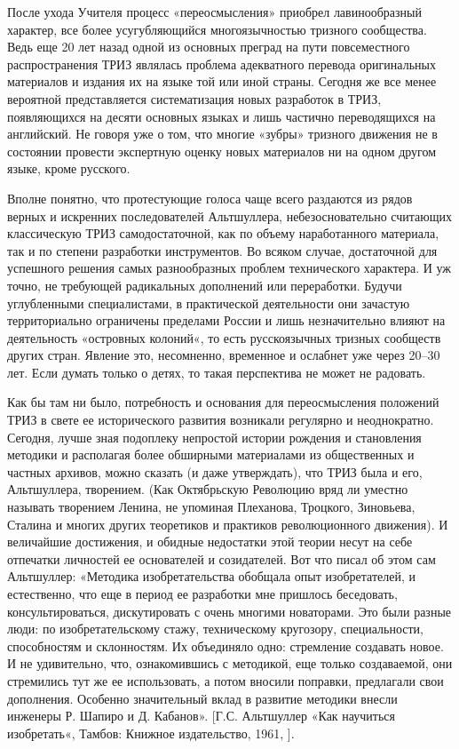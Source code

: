 \documentclass[11pt,a4paper]{article}
\begin{document}
После ухода Учителя процесс «переосмысления» приобрел лавинообразный характер,
все более усугубляющийся многоязычностью тризного сообщества. Ведь еще 20 лет
назад одной из основных преград на пути повсеместного распространения ТРИЗ
являлась проблема адекватного перевода оригинальных материалов и издания их на
языке той или иной страны. Сегодня же все менее вероятной представляется
систематизация новых разработок в ТРИЗ, появляющихся на десяти основных языках
и лишь частично переводящихся на английский. Не говоря уже о том, что многие
«зубры» тризного движения не в состоянии провести экспертную оценку новых
материалов ни на одном другом языке, кроме русского.

Вполне понятно, что протестующие голоса чаще всего раздаются из рядов верных и
искренних последователей Альтшуллера, небезосновательно считающих классическую
ТРИЗ самодостаточной, как по объему наработанного материала, так и по степени
разработки инструментов. Во всяком случае, достаточной для успешного решения
самых разнообразных проблем технического характера. И уж точно, не требующей
радикальных дополнений или переработки. Будучи углубленными специалистами, в
практической деятельности они зачастую территориально ограничены пределами
России и лишь незначительно влияют на деятельность «островных колоний«, то
есть русскоязычных тризных сообществ других стран. Явление это, несомненно,
временное и ослабнет уже через 20--30 лет. Если думать только о детях, то
такая перспектива не может не радовать.

Как бы там ни было, потребность и основания для переосмысления положений ТРИЗ
в свете ее исторического развития возникали регулярно и неоднократно. Сегодня,
лучше зная подоплеку непростой истории рождения и становления методики и
располагая более обширными материалами из общественных и частных архивов,
можно сказать (и даже утверждать), что ТРИЗ была и его, Альтшуллера,
творением.  (Как Октябрьскую Революцию вряд ли уместно называть творением
Ленина, не упоминая Плеханова, Троцкого, Зиновьева, Сталина и многих других
теоретиков и практиков революционного движения). И величайшие достижения, и
обидные недостатки этой теории несут на себе отпечатки личностей ее
основателей и созидателей. Вот что писал об этом сам Альтшуллер: «Методика
изобретательства обобщала опыт изобретателей, и естественно, что еще в период
ее разработки мне пришлось беседовать, консультироваться, дискутировать с
очень многими новаторами. Это были разные люди: по изобретательскому стажу,
техническому кругозору, специальности, способностям и склонностям. Их
объединяло одно: стремление создавать новое. И не удивительно, что,
ознакомившись с методикой, еще только создаваемой, они стремились тут же ее
использовать, а потом вносили поправки, предлагали свои дополнения. Особенно
значительный вклад в развитие методики внесли инженеры Р. Шапиро и
Д. Кабанов». [Г.С. Альтшуллер «Как научиться изобретать«, Тамбов: Книжное
  издательство, 1961, ].
\end{document}
